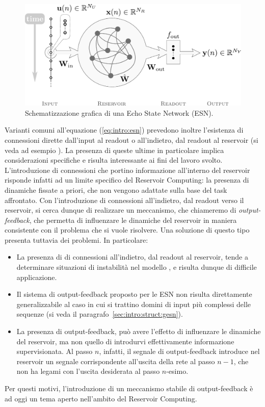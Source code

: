 \begin{figure}[tbp]
\centering
\includegraphics[width=0.8\columnwidth]{img/ESN}
\medskip
\caption[Echo State Network.]{Schematizzazione grafica di una Echo State Network (ESN).}
\label{fig:intro:esn}
\end{figure}

Varianti comuni all'equazione (\ref{eq:intro:esn}) prevedono inoltre l'esistenza di connessioni dirette dall'input al readout o all'indietro, dal readout al reservoir (si veda ad esempio \cite{Jaeger:EchoStateApproach, Jaeger:ShortTermMemory}). La presenza di queste ultime in particolare implica considerazioni specifiche e risulta interessante ai fini del lavoro svolto. L'introduzione di connessioni che portino informazione all'interno del reservoir risponde infatti ad un limite specifico del Reservoir Computing: la presenza di dinamiche fissate a priori, che non vengono adattate sulla base del task affrontato. Con l'introduzione di connessioni all'indietro, dal readout verso il reservoir, si cerca dunque di realizzare un meccanismo, che chiameremo di \emph{output-feedback}, che permetta di influenzare le dinamiche del reservoir in maniera consistente con il problema che si vuole risolvere. Una soluzione di questo tipo presenta tuttavia dei problemi. In particolare:
\begin{itemize}
\item La presenza di di connessioni all'indietro, dal readout al reservoir, tende a determinare situazioni di instabilità nel modello \cite{Lukosevicius:ESNwithTrainedFeedbacks, Wyffels:stableOutputFeedback}, e risulta dunque di difficile applicazione.
\item Il sistema di output-feedback proposto per le ESN non risulta direttamente generalizzabile al caso in cui si trattino domini di input più complessi delle sequenze (si veda il paragrafo~\vref{sec:intro:struct:gesn}).
\item La presenza di output-feedback, può avere l'effetto di influenzare le dinamiche del reservoir, ma non quello di introdurvi effettivamente informazione supervisionata. Al passo $n$, infatti, il segnale di output-feedback introduce nel reservoir un segnale corrispondente all'uscita della rete al passo $n-1$, che non ha legami con l'uscita desiderata al passo $n$-esimo. 
\end{itemize}
Per questi motivi, l'introduzione di un meccanismo stabile di output-feedback è ad oggi un tema aperto nell'ambito del Reservoir Computing.

